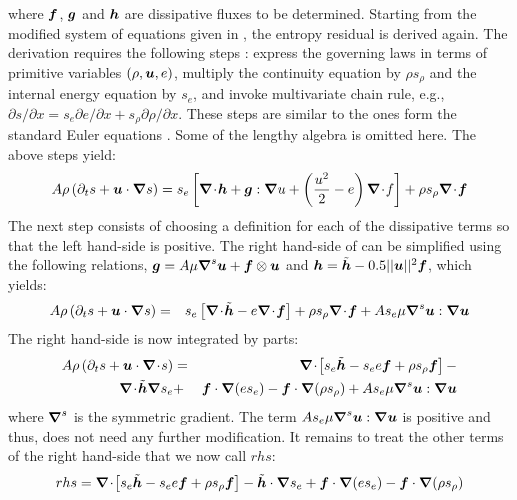 %
where $\boldsymbol f$, $\boldsymbol g$ and $\boldsymbol h$ are dissipative fluxes to be determined. Starting from the modified system of equations given in , the entropy residual is derived again. The derivation requires the following steps : express the governing laws in terms of primitive variables $(\rho, \boldsymbol u, e)$, multiply the continuity equation by $\rho s_\rho$ and the internal energy equation by $s_e$, and invoke multivariate chain rule, e.g., $\partial s /\partial x = s_e \partial e /\partial x + s_\rho \partial \rho /\partial x$. These steps are similar to the ones form the standard Euler equations \cite{jlg}. Some of the lengthy algebra is omitted here. The above steps yield:
%
\begin{multline}
\label{eq:ent_res_app}
A \rho \left( \partial_t s + \boldsymbol u \cdot \boldsymbol{\nabla} s \right) = s_e \left[ \boldsymbol{\nabla}\! \cdot \! \boldsymbol h + \boldsymbol g : \boldsymbol{\nabla} u + \left( \frac{u^2}{2}-e \right) \boldsymbol{\nabla}\! \cdot \! f \right] 
+ \rho s_{\rho} \boldsymbol{\nabla}\! \cdot \! \boldsymbol f
\end{multline}
%
The next step consists of choosing a definition for each of the dissipative terms so that the left hand-side is positive. The right hand-side of  can be simplified using the following relations, $\boldsymbol g = A \mu \boldsymbol{\nabla}^s \boldsymbol u + \boldsymbol f \otimes \boldsymbol u$ and $\boldsymbol h = \tilde{\boldsymbol h} - 0.5 || \boldsymbol u ||^2 \boldsymbol f$, which yields:
%
\begin{eqnarray}
\label{eq:ent_res_app2}
A \rho \left( \partial_t s + \boldsymbol u \cdot \boldsymbol{\nabla} s \right) &=& s_e \left[ \boldsymbol{\nabla}\! \cdot \! \tilde{\boldsymbol h}-e \boldsymbol{\nabla}\! \cdot \! \boldsymbol f \right] + \rho s_{\rho} \boldsymbol{\nabla}\! \cdot \! \boldsymbol f  + A s_e \mu \boldsymbol{\nabla}^s \boldsymbol u : \boldsymbol{\nabla} \boldsymbol u\nonumber
\end{eqnarray}
%
The right hand-side is now integrated by parts:
%
\begin{eqnarray}
\label{eq:ent_res_app3}
A \rho \left( \partial_t s + \boldsymbol u \cdot \boldsymbol{\nabla}\! \cdot \! s \right) &=& \boldsymbol{\nabla}\! \cdot \! \left[ s_e \tilde{\boldsymbol h}-s_e e \boldsymbol f  + \rho s_{\rho} \boldsymbol f \right] -\nonumber \\
\boldsymbol{\nabla}\! \cdot \! \tilde{\boldsymbol h} \boldsymbol{\nabla} s_e  &+& \boldsymbol f \cdot \boldsymbol{\nabla} (e s_e) - \boldsymbol f \cdot \boldsymbol{\nabla} ( \rho s_{\rho} ) + A s_e \mu \boldsymbol{\nabla}^s \boldsymbol u : \boldsymbol{\nabla} \boldsymbol u \nonumber
\end{eqnarray}
%
where $\boldsymbol{\nabla}^s$ is the symmetric gradient. The term $A s_e \mu \boldsymbol{\nabla}^s \boldsymbol u : \boldsymbol{\nabla} \boldsymbol u$ is positive and thus, does not need any further modification. It %
remains to treat the other terms of the right hand-side that we now call $rhs$:
%
\begin{equation}\label{eq:rhs-euler-equ-app1}
rhs = \boldsymbol{\nabla}\! \cdot \! \left[ s_e \tilde{\boldsymbol h}-s_e e \boldsymbol f  + \rho s_{\rho} \boldsymbol f \right] - \tilde{\boldsymbol h} \cdot \boldsymbol{\nabla} s_e  + \boldsymbol f \cdot \boldsymbol{\nabla} (e s_e) - \boldsymbol f \cdot \boldsymbol{\nabla} ( \rho s_{\rho} ) \nonumber
\end{equation}
